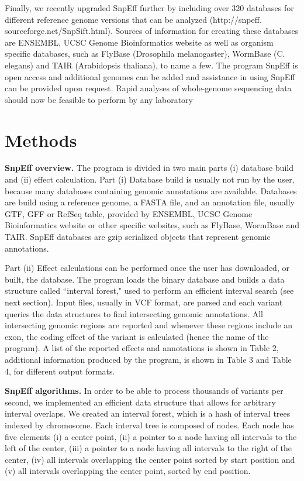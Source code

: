 Finally, we recently upgraded SnpEff further by including over 320 databases for different reference genome versions that can be analyzed (http://snpeff.  sourceforge.net/SnpSift.html). Sources of information for creating these databases are ENSEMBL, UCSC Genome Bioinformatics website as well as organism specific databases, such as FlyBase (Drosophila melanogaster), WormBase (C.  elegans) and TAIR (Arabidopsis thaliana), to name a few. The program SnpEff is open access and additional genomes can be added and assistance in using SnpEff can be provided upon request. Rapid analyses of whole-genome sequencing data should now be feasible to perform by any laboratory

\section{Methods}

\textbf{SnpEff overview.} The program is divided in two main parts (i) database build and (ii) effect calculation. Part (i) Database build is usually not run by the user, because many databases containing genomic annotations are available. Databases are build using a reference genome, a FASTA file, and an annotation file, usually GTF, GFF or RefSeq table, provided by ENSEMBL, UCSC Genome Bioinformatics website or other specific websites, such as FlyBase, WormBase and TAIR. SnpEff databases are gzip serialized objects that represent genomic annotations.

Part (ii) Effect calculations can be performed once the user has downloaded, or built, the database. The program loads the binary database and builds a data structure called ``interval forest," used to perform an efficient interval search (see next section). Input files, usually in VCF format, are parsed and each variant queries the data structures to find intersecting genomic annotations. All intersecting genomic regions are reported and whenever these regions include an exon, the coding effect of the variant is calculated (hence the name of the program). A list of the reported effects and annotations is shown in Table 2, additional information produced by the program, is shown in Table 3 and Table 4, for different output formats.

\textbf{SnpEff algorithms.} In order to be able to process thousands of variants per second, we implemented an efficient data structure that allows for arbitrary interval overlaps. We created an interval forest, which is a hash of interval trees indexed by chromosome.  Each interval tree \cite{cormen2001introduction} is composed of nodes. Each node has five elements (i) a center point, (ii) a pointer to a node having all intervals to the left of the center, (iii) a pointer to a node having all intervals to the right of the center, (iv) all intervals overlapping the center point sorted by start position and (v) all intervals overlapping the center point, sorted by end position.

